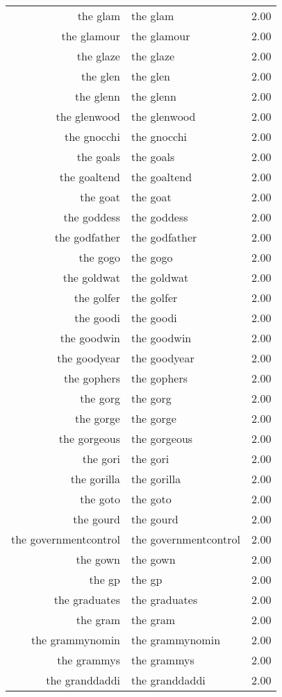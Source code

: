 \begin{table}[ht]
\begin{tabular}{rlr}
  the glam & the glam & 2.00 \\ 
  the glamour & the glamour & 2.00 \\ 
  the glaze & the glaze & 2.00 \\ 
  the glen & the glen & 2.00 \\ 
  the glenn & the glenn & 2.00 \\ 
  the glenwood & the glenwood & 2.00 \\ 
  the gnocchi & the gnocchi & 2.00 \\ 
  the goals & the goals & 2.00 \\ 
  the goaltend & the goaltend & 2.00 \\ 
  the goat & the goat & 2.00 \\ 
  the goddess & the goddess & 2.00 \\ 
  the godfather & the godfather & 2.00 \\ 
  the gogo & the gogo & 2.00 \\ 
  the goldwat & the goldwat & 2.00 \\ 
  the golfer & the golfer & 2.00 \\ 
  the goodi & the goodi & 2.00 \\ 
  the goodwin & the goodwin & 2.00 \\ 
  the goodyear & the goodyear & 2.00 \\ 
  the gophers & the gophers & 2.00 \\ 
  the gorg & the gorg & 2.00 \\ 
  the gorge & the gorge & 2.00 \\ 
  the gorgeous & the gorgeous & 2.00 \\ 
  the gori & the gori & 2.00 \\ 
  the gorilla & the gorilla & 2.00 \\ 
  the goto & the goto & 2.00 \\ 
  the gourd & the gourd & 2.00 \\ 
  the governmentcontrol & the governmentcontrol & 2.00 \\ 
  the gown & the gown & 2.00 \\ 
  the gp & the gp & 2.00 \\ 
  the graduates & the graduates & 2.00 \\ 
  the gram & the gram & 2.00 \\ 
  the grammynomin & the grammynomin & 2.00 \\ 
  the grammys & the grammys & 2.00 \\ 
  the granddaddi & the granddaddi & 2.00 \\ 

\end{tabular}
\end{table}
